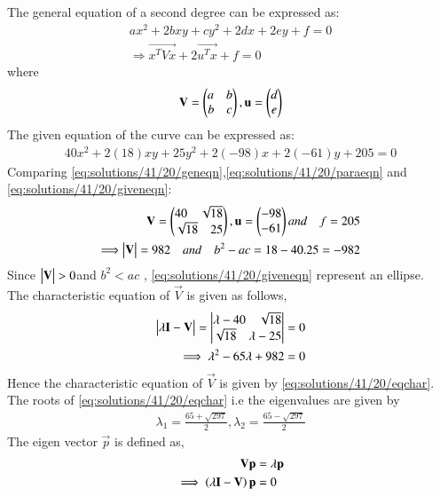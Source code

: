 The general equation of a second degree can
be expressed as:
\begin{align}
a{x^2}+2b{xy}+c{y^2}+2d{x}+2e{y}+f=0\label{eq:solutions/41/20/geneqn}\\
   \Longrightarrow \vec{x^TVx}+2\vec{u^Tx}+f=0\label{eq:solutions/41/20/geneqn2}
\end{align}
where\begin{align}
\mathbf{V} =\begin{pmatrix}a\quad b\\b\quad c\end{pmatrix},\mathbf{u}=\begin{pmatrix}d\\e\end{pmatrix}\label{eq:solutions/41/20/paraeqn} 
\end{align}
The given equation of the curve can be expressed as:
\begin{align}
    40{x^2}+2(18){xy}+25{y^2}+2(-98){x}+2(-61){y}+205=0\label{eq:solutions/41/20/giveneqn}
\end{align}
Comparing \eqref{eq:solutions/41/20/geneqn},\eqref{eq:solutions/41/20/paraeqn} and \eqref{eq:solutions/41/20/giveneqn}:\\
\begin{align}
\mathbf{V} = \begin{pmatrix}40\quad\sqrt{18}\\\sqrt{18}\quad 25\end{pmatrix},\mathbf{u}=\begin{pmatrix}-98\\-61\end{pmatrix} and\quad f=205 \\
       \Longrightarrow\begin{vmatrix}\mathbf{V}\end{vmatrix}=982\quad and \quad b^2-ac=18-40.25 =-982
\end{align}
Since $\begin{vmatrix}\mathbf{V}\end{vmatrix}>0$\quad and \quad $b^2<ac$ , \eqref{eq:solutions/41/20/giveneqn} represent an ellipse. \\
 The characteristic equation of $\vec{V}$ is given as follows,
\begin{align}
\begin{vmatrix}\lambda\mathbf{I}-\mathbf{V}\end{vmatrix} = \begin{vmatrix}\lambda-40\quad\sqrt{18}\\\sqrt{18}\quad\lambda -25\end{vmatrix} &= 0\\
\implies \lambda^2-65\lambda+982 &= 0\label{eq:solutions/41/20/eqchar}
\end{align}
Hence the characteristic equation of $\vec{V}$ is given by \eqref{eq:solutions/41/20/eqchar}. The roots of \eqref{eq:solutions/41/20/eqchar} i.e the eigenvalues are given by
\begin{align}
\lambda_1=\frac{65+\sqrt{297}}{2}, \lambda_2=\frac{65-\sqrt{297}}{2}\label{eq:solutions/41/20/eqeigenvals}    
\end{align}
The eigen vector $\vec{p}$ is defined as, 
\begin{align}
\mathbf{V}\mathbf{p} &= \lambda\mathbf{p}\\
\implies\left(\lambda\mathbf{I}-\mathbf{V}\right)\mathbf{p}&=0\label{eq:solutions/41/20/eqneigvenvec}
\end{align}

